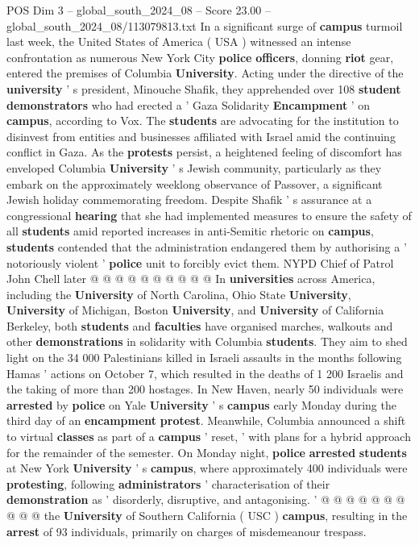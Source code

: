 \begin{textsample}{POS Dim 3 – global\_south\_2024\_08 – Score 23.00 – global\_south\_2024\_08/113079813.txt}  \label{ex:f3_pos_329}
In a significant surge of \textbf{campus} turmoil last week, the United States of America ( USA ) witnessed an intense confrontation as numerous New York City \textbf{police} \textbf{officers}, donning \textbf{riot} gear, entered the premises of Columbia \textbf{University}.
Acting under the directive of the \textbf{university} ' s president, Minouche Shafik, they apprehended over 108 \textbf{student} \textbf{demonstrators} who had erected a ' Gaza Solidarity \textbf{Encampment} ' on \textbf{campus}, according to Vox.
The \textbf{students} are advocating for the institution to disinvest from entities and businesses affiliated with Israel amid the continuing conflict in Gaza.
As the \textbf{protests} persist, a heightened feeling of discomfort has enveloped Columbia \textbf{University} ' s Jewish community, particularly as they embark on the approximately weeklong observance of Passover, a significant Jewish holiday commemorating freedom.
Despite Shafik ' s assurance at a congressional \textbf{hearing} that she had implemented measures to ensure the safety of all \textbf{students} amid reported increases in anti-Semitic rhetoric on \textbf{campus}, \textbf{students} contended that the administration endangered them by authorising a ' notoriously violent ' \textbf{police} unit to forcibly evict them.
NYPD Chief of Patrol John Chell later @ @ @ @ @ @ @ @ @ @ In \textbf{universities} across America, including the \textbf{University} of North Carolina, Ohio State \textbf{University}, \textbf{University} of Michigan, Boston \textbf{University}, and \textbf{University} of California Berkeley, both \textbf{students} and \textbf{faculties} have organised marches, walkouts and other \textbf{demonstrations} in solidarity with Columbia \textbf{students}.
They aim to shed light on the 34 000 Palestinians killed in Israeli assaults in the months following Hamas ' actions on October 7, which resulted in the deaths of 1 200 Israelis and the taking of more than 200 hostages.
In New Haven, nearly 50 individuals were \textbf{arrested} by \textbf{police} on Yale \textbf{University} ' s \textbf{campus} early Monday during the third day of an \textbf{encampment} \textbf{protest}.
Meanwhile, Columbia announced a shift to virtual \textbf{classes} as part of a \textbf{campus} ' reset, ' with plans for a hybrid approach for the remainder of the semester.
On Monday night, \textbf{police} \textbf{arrested} \textbf{students} at New York \textbf{University} ' s \textbf{campus}, where approximately 400 individuals were \textbf{protesting}, following \textbf{administrators} ' characterisation of their \textbf{demonstration} as ' disorderly, disruptive, and antagonising. ' @ @ @ @ @ @ @ @ @ @ the \textbf{University} of Southern California ( USC ) \textbf{campus}, resulting in the \textbf{arrest} of 93 individuals, primarily on charges of misdemeanour trespass.

\end{textsample}
